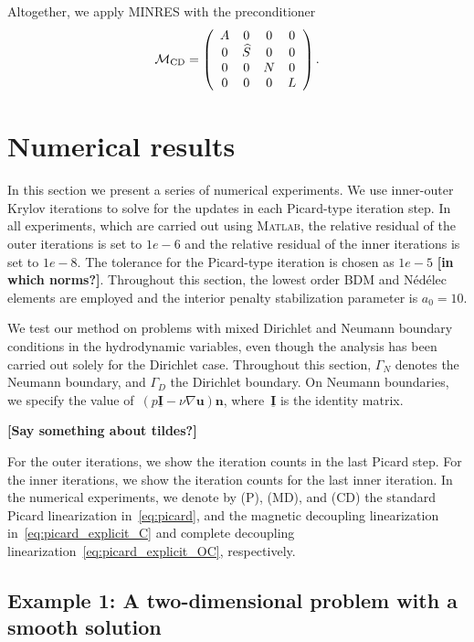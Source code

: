 \documentclass{siamltex}
\newcommand{\uu}[1]{\boldsymbol #1}                     %
\begin{document}
Altogether, we apply MINRES with the preconditioner
\begin{equation}
\label{eq:mhd_pc_explicit2}
\mathcal{M}_{\rm CD} =
\left(
\begin{array}{cccc}
A & 0 & 0 & 0\\
0 & \widehat{S} & 0 & 0 \\
0 & 0 & N & 0\\
0 & 0 & 0 & L
\end{array}
\right).
\end{equation}




\section{Numerical results}
\label{sec:numerical_results_mhd_solver}

In this section we present a series of
numerical experiments.
We use inner-outer Krylov iterations to solve for the updates in each Picard-type iteration step.
In all experiments, which are carried out using
{\textsc{Matlab}}, the relative
residual of the outer iterations is set to $1e-6$ and the relative residual of the inner iterations
is set to $1e-8$. The tolerance for the Picard-type iteration is chosen as $1e-5$ {\bf [in which norms?]}.
Throughout this section, the lowest order BDM and N\'{e}d\'{e}lec
elements are employed and the interior penalty stabilization
parameter is $a_0 = 10$.

We test our method on problems with mixed Dirichlet and Neumann
boundary conditions in the hydrodynamic variables, even though the
analysis has been carried out solely for the Dirichlet case.
Throughout this section, $\Gamma_N$ denotes the Neumann boundary,
and $\Gamma_D$ the Dirichlet boundary. On Neumann boundaries, we
specify the value of~$(p\underline{\uu{I}}-\nu \nabla\uu{u})
\uu{n}$, where~$\underline{\uu{I}}$ is the identity matrix.

{\bf [Say something about tildes?]}


For the outer iterations, we show the iteration counts in the last Picard step. For the inner iterations, we show the iteration counts for the last inner iteration. In the numerical experiments,  we denote by (P),  (MD), and  (CD) the standard Picard linearization in~\eqref{eq:picard}, and the magnetic decoupling linearization in~\eqref{eq:picard_explicit_C} and complete decoupling linearization~\eqref{eq:picard_explicit_OC}, respectively.

\subsection{Example 1: A two-dimensional problem with a smooth solution}
\end{document}
